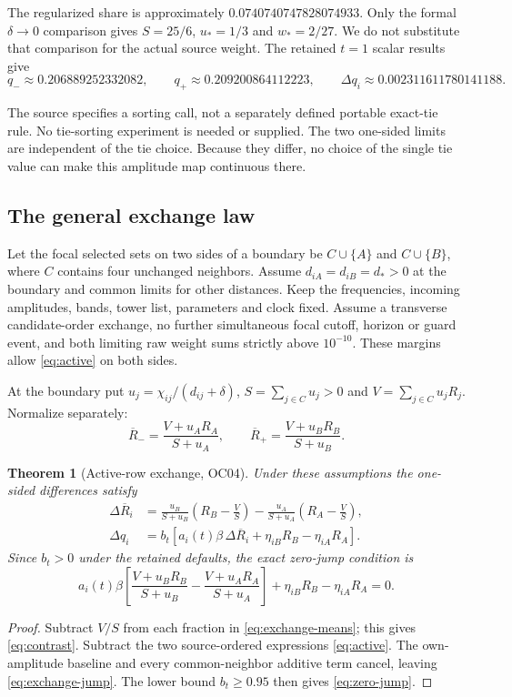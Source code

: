 \documentclass[11pt,a4paper]{article}
\newtheorem{theorem}{Theorem}[section]
\theoremstyle{remark}\newtheorem{remark}[theorem]{Remark}
\newcommand{\Rbar}{\overline R}
\numberwithin{equation}{section}
\begin{document}
The regularized share is approximately $0.0740740747828074933$.
Only the formal $\delta\to0$ comparison gives $S=25/6$, $u_*=1/3$ and
$w_*=2/27$. We do not substitute that comparison for the actual source weight.
The retained $t=1$ scalar results give
\[
q_-\approx0.206889252332082,\qquad
q_+\approx0.209200864112223,\qquad
\Delta q_i\approx0.002311611780141188.
\]

The source specifies a sorting call, not a separately defined portable
exact-tie rule. No tie-sorting experiment is needed or supplied.
The two one-sided limits are independent of the tie choice. Because they
differ, no choice of the single tie value can make this amplitude map
continuous there.

\subsection{The general exchange law}\label{sec:exchange}

Let the focal selected sets on two sides of a boundary be
$C\cup\{A\}$ and $C\cup\{B\}$, where $C$ contains four unchanged neighbors.
Assume $d_{iA}=d_{iB}=d_*>0$ at the boundary and common limits for other
distances. Keep the frequencies, incoming amplitudes, bands, tower list,
parameters and clock fixed. Assume a transverse candidate-order exchange,
no further simultaneous focal cutoff, horizon or guard event, and both
limiting raw weight sums strictly above $10^{-10}$.
These margins allow \eqref{eq:active} on both sides.

At the boundary put $u_j=\chi_{ij}/(d_{ij}+\delta)$,
$S=\sum_{j\in C}u_j>0$ and $V=\sum_{j\in C}u_jR_j$.
Normalize separately:
\begin{equation}
\Rbar_-=\frac{V+u_AR_A}{S+u_A},\qquad
\Rbar_+=\frac{V+u_BR_B}{S+u_B}.\label{eq:exchange-means}
\end{equation}

\begin{theorem}[Active-row exchange, OC04]\label{thm:exchange}
Under these assumptions the one-sided differences satisfy
\begin{align}
\Delta\Rbar_i
&=\frac{u_B}{S+u_B}\left(R_B-\frac VS\right)
-\frac{u_A}{S+u_A}\left(R_A-\frac VS\right),\label{eq:contrast}\\
\Delta q_i
&=b_t\left[a_i(t)\beta\,\Delta\Rbar_i
           +\eta_{iB}R_B-\eta_{iA}R_A\right].\label{eq:exchange-jump}
\end{align}
Since $b_t>0$ under the retained defaults, the exact zero-jump condition is
\begin{equation}
a_i(t)\beta\left[
\frac{V+u_BR_B}{S+u_B}-\frac{V+u_AR_A}{S+u_A}
\right]+\eta_{iB}R_B-\eta_{iA}R_A=0.\label{eq:zero-jump}
\end{equation}
\end{theorem}
\begin{proof}
Subtract $V/S$ from each fraction in \eqref{eq:exchange-means}; this gives
\eqref{eq:contrast}. Subtract the two source-ordered expressions
\eqref{eq:active}. The own-amplitude baseline and every common-neighbor
additive term cancel, leaving \eqref{eq:exchange-jump}. The lower bound
$b_t\ge0.95$ then gives \eqref{eq:zero-jump}.
\end{proof}
\end{document}
